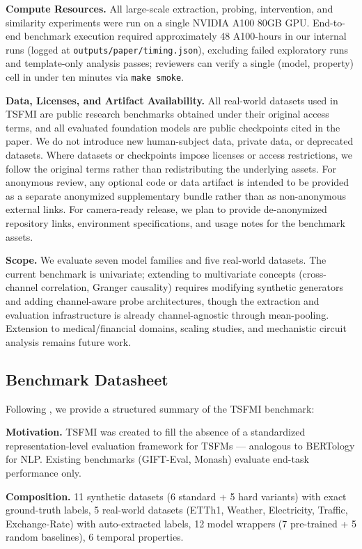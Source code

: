 \documentclass{article}
\begin{document}
\textbf{Compute Resources.} All large-scale extraction, probing, intervention, and similarity
experiments were run on a single NVIDIA A100 80GB GPU. End-to-end benchmark execution required
approximately 48 A100-hours in our internal runs (logged at \texttt{outputs/paper/timing.json}),
excluding failed exploratory runs and template-only analysis passes; reviewers can verify a
single (model, property) cell in under ten minutes via \texttt{make smoke}.

\textbf{Data, Licenses, and Artifact Availability.} All real-world datasets used in TSFMI are
public research benchmarks obtained under their original access terms, and all evaluated foundation
models are public checkpoints cited in the paper. We do not introduce new human-subject data,
private data, or deprecated datasets. Where datasets or checkpoints impose licenses or access
restrictions, we follow the original terms rather than redistributing the underlying assets. For
anonymous review, any optional code or data artifact is intended to be provided as a separate
anonymized supplementary bundle rather than as non-anonymous external links. For camera-ready
release, we plan to provide de-anonymized repository links, environment specifications, and usage
notes for the benchmark assets.

\textbf{Scope.} We evaluate seven model families and five real-world datasets. The current benchmark is univariate; extending to multivariate concepts (cross-channel correlation, Granger causality) requires modifying synthetic generators and adding channel-aware probe architectures, though the extraction and evaluation infrastructure is already channel-agnostic through mean-pooling. Extension to medical/financial domains, scaling studies, and mechanistic circuit analysis remains future work.

\subsection{Benchmark Datasheet}
\label{sec:datasheet}

Following \cite{Gebru2021,Mitchell2019}, we provide a structured summary of the TSFMI benchmark:

\textbf{Motivation.} TSFMI was created to fill the absence of a standardized representation-level evaluation framework for TSFMs --- analogous to BERTology \cite{Rogers2021} for NLP. Existing benchmarks (GIFT-Eval, Monash) evaluate end-task performance only.

\textbf{Composition.} 11 synthetic datasets (6 standard + 5 hard variants) with exact ground-truth labels, 5 real-world datasets (ETTh1, Weather, Electricity, Traffic, Exchange-Rate) with auto-extracted labels, 12 model wrappers (7 pre-trained + 5 random baselines), 6 temporal properties.
\end{document}
